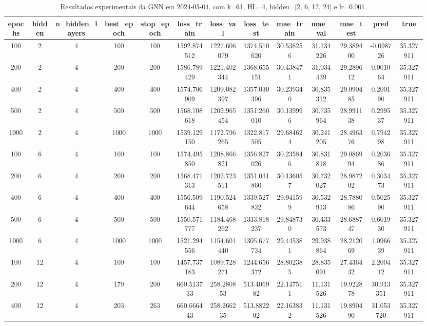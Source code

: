 \begin{table}[h]
\centering
\caption{Resultados experimentais da GNN em 2024-05-04, com k=61, HL=4, hidden=[2, 6, 12, 24] e lr=0.001.}
\label{tab:gnn_results_k61_hl4_d20240504}
\begin{tabular}{ccccccccccccc}
\toprule
epochs & hidden & n\_hidden\_layers & best\_epoch & stop\_epoch & loss\_train & loss\_val & loss\_test & mae\_train & mae\_val & mae\_test & pred & true \\
\midrule
100 & 2 & 4 & 100 & 100 & 1592.874512 & 1227.606079 & 1374.510620 & 30.538256 & 31.134226 & 29.389400 & -0.098726 & 35.327911 \\
200 & 2 & 4 & 200 & 200 & 1586.789429 & 1221.402344 & 1368.655151 & 30.438471 & 31.034439 & 29.289612 & 0.001064 & 35.327911 \\
400 & 2 & 4 & 400 & 400 & 1574.706909 & 1209.082397 & 1357.030396 & 30.239340 & 30.835312 & 29.090485 & 0.200190 & 35.327911 \\
500 & 2 & 4 & 500 & 500 & 1568.708618 & 1202.965454 & 1351.260010 & 30.139996 & 30.735964 & 28.991138 & 0.299537 & 35.327911 \\
1000 & 2 & 4 & 1000 & 1000 & 1539.129150 & 1172.796265 & 1322.817505 & 29.684624 & 30.241205 & 28.496376 & 0.794298 & 35.327911 \\
100 & 6 & 4 & 100 & 100 & 1574.495850 & 1208.866821 & 1356.827026 & 30.235846 & 30.831818 & 29.086994 & 0.203686 & 35.327911 \\
200 & 6 & 4 & 200 & 200 & 1568.471313 & 1202.723511 & 1351.031860 & 30.136057 & 30.732027 & 28.987202 & 0.303473 & 35.327911 \\
400 & 6 & 4 & 400 & 400 & 1556.509644 & 1190.524658 & 1339.527832 & 29.941599 & 30.532913 & 28.788086 & 0.502590 & 35.327911 \\
500 & 6 & 4 & 500 & 500 & 1550.571777 & 1184.468262 & 1333.818237 & 29.848730 & 30.433573 & 28.688747 & 0.601930 & 35.327911 \\
1000 & 6 & 4 & 1000 & 1000 & 1521.294556 & 1154.601440 & 1305.677734 & 29.445381 & 29.938864 & 28.212069 & 1.096639 & 35.327911 \\
100 & 12 & 4 & 100 & 100 & 1457.737183 & 1089.728271 & 1244.656372 & 28.802385 & 28.835091 & 27.436432 & 2.200412 & 35.327911 \\
200 & 12 & 4 & 179 & 200 & 660.513733 & 258.280853 & 513.406982 & 22.147511 & 11.131526 & 19.922878 & 30.913351 & 35.327911 \\
400 & 12 & 4 & 203 & 263 & 660.666443 & 258.266235 & 513.882202 & 22.163832 & 11.131526 & 19.890490 & 31.053720 & 35.327911 \\

\end{tabular}
\end{table}
